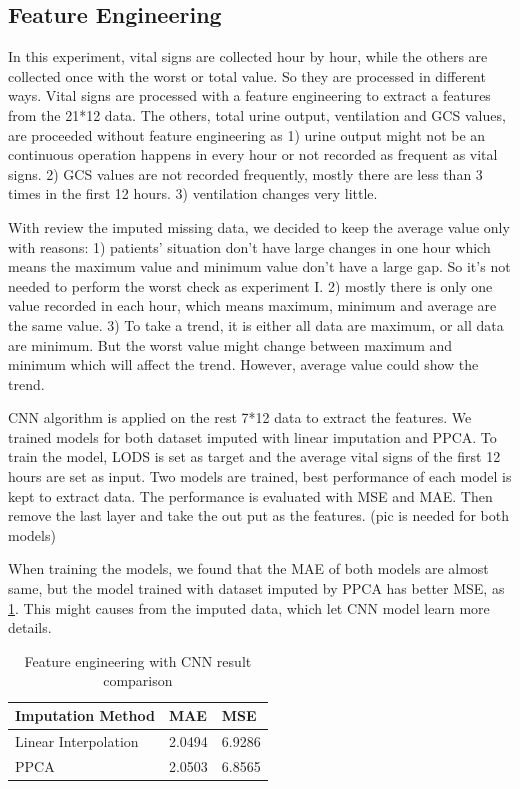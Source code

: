 \documentclass[12pt,a4paper,english
]{tunithesis}
\begin{document}
\subsection{Feature Engineering}

In this experiment, vital signs are collected hour by hour, while the others are collected once with the worst or total value. So they are processed in different ways. Vital signs are processed with a feature engineering to extract a features from the 21*12 data. The others, total urine output, ventilation and GCS values, are proceeded without feature engineering as 1) urine output might not be an continuous operation happens in every hour or not recorded as frequent as vital signs. 2) GCS values are not recorded frequently, mostly there are less than 3 times in the first 12 hours. 3) ventilation changes very little.

With review the imputed missing data, we decided to keep the average value only with reasons: 1) patients' situation don't have large changes in one hour which means the maximum value and minimum value don't have a large gap. So it's not needed to perform the worst check as experiment I. 2) mostly there is only one value recorded in each hour, which means maximum, minimum and average are the same value. 3) To take a trend, it is either all data are maximum, or all data are minimum. But the worst value might change between maximum and minimum which will affect the trend. However, average value could show the trend. 

CNN algorithm is applied on the rest 7*12 data to extract the features. We trained models for both dataset imputed with linear imputation and PPCA. To train the model, LODS is set as target and the average vital signs of the first 12 hours are set as input. Two models are trained, best performance of each model is kept to extract data. The performance is evaluated with MSE and MAE. Then remove the last layer and take the out put as the features. (pic is needed for both models)

When training the models, we found that the MAE of both models are almost same, but the model trained with dataset imputed by PPCA has better MSE, as \ref{table:cnn_result_comparison}. This might causes from the imputed data, which let CNN model learn more details.

\begin{table}[]
\centering
    \caption{Feature engineering with CNN result comparison}
    \label{table:cnn_result_comparison}
    \begin{tabular}{|l|l|l|}
        \hline
        \textbf{Imputation Method} & \textbf{MAE} & \textbf{MSE} \\ \hline
        Linear Interpolation & 2.0494 & 6.9286 \\ \hline
        PPCA & 2.0503 & 6.8565 \\ \hline
    \end{tabular}
\end{table}
\end{document}
